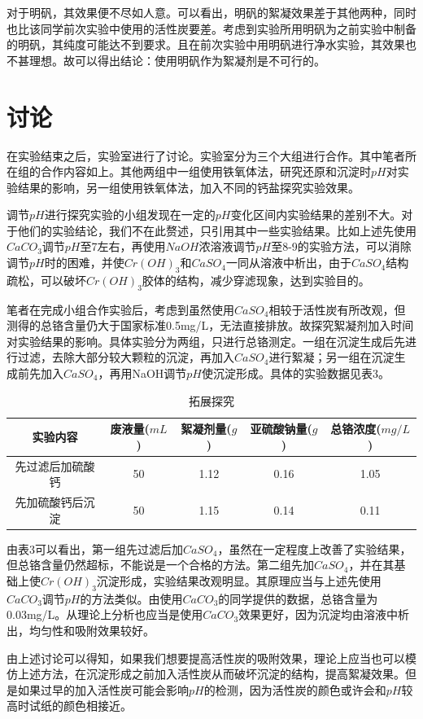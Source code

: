\documentclass[UTF8,a4paper,11pt,twocolumn]{ctexart}
\begin{document}
对于明矾，其效果便不尽如人意。可以看出，明矾的絮凝效果差于其他两种，同时也比该同学前次实验中使用的活性炭要差。考虑到实验所用明矾为之前实验中制备的明矾，其纯度可能达不到要求。且在前次实验中用明矾进行净水实验，其效果也不甚理想。故可以得出结论：使用明矾作为絮凝剂是不可行的。

\section{讨论}
在实验结束之后，实验室进行了讨论。实验室分为三个大组进行合作。其中笔者所在组的合作内容如上。其他两组中一组使用铁氧体法，研究还原和沉淀时$pH$对实验结果的影响，另一组使用铁氧体法，加入不同的钙盐探究实验效果。

调节$pH$进行探究实验的小组发现在一定的$pH$变化区间内实验结果的差别不大。对于他们的实验结论，我们不在此赘述，只引用其中一些实验结果。比如上述先使用$CaCO_3$调节$pH$至7左右，再使用$NaOH$浓溶液调节$pH$至8-9的实验方法，可以消除调节$pH$时的困难，并使$Cr(OH)_3$和$CaSO_4$一同从溶液中析出，由于$CaSO_4$结构疏松，可以破坏$Cr(OH)_3$胶体的结构，减少穿滤现象，达到实验目的。

笔者在完成小组合作实验后，考虑到虽然使用$CaSO_4$相较于活性炭有所改观，但测得的总铬含量仍大于国家标准0.5mg/L，无法直接排放。故探究絮凝剂加入时间对实验结果的影响。具体实验分为两组，只进行总铬测定。一组在沉淀生成后先进行过滤，去除大部分较大颗粒的沉淀，再加入$CaSO_4$进行絮凝；另一组在沉淀生成前先加入$CaSO_4$，再用NaOH调节$pH$使沉淀形成。具体的实验数据见表3。

\begin{table}[h]
\centering
\addtolength{\tabcolsep}{-1mm}
\begin{tabular}{ccccc}
\toprule
实验内容&废液量($mL$)&絮凝剂量($g$)&亚硫酸钠量($g$)&总铬浓度($mg/L$)\\
\midrule
先过滤后加硫酸钙&50&1.12&0.16&1.05\\
先加硫酸钙后沉淀&50&1.15&0.14&0.11\\
\bottomrule
\end{tabular}
\caption{拓展探究}
\end{table}

由表3可以看出，第一组先过滤后加$CaSO_4$，虽然在一定程度上改善了实验结果，但总铬含量仍然超标，不能说是一个合格的方法。第二组先加$CaSO_4$，并在其基础上使$Cr(OH)_3$沉淀形成，实验结果改观明显。其原理应当与上述先使用$CaCO_3$调节$pH$的方法类似。由使用$CaCO_3$的同学提供的数据，总铬含量为0.03mg/L。从理论上分析也应当是使用$CaCO_3$效果更好，因为沉淀均由溶液中析出，均匀性和吸附效果较好。

由上述讨论可以得知，如果我们想要提高活性炭的吸附效果，理论上应当也可以模仿上述方法，在沉淀形成之前加入活性炭从而破坏沉淀的结构，提高絮凝效果。但是如果过早的加入活性炭可能会影响$pH$的检测，因为活性炭的颜色或许会和$pH$较高时试纸的颜色相接近。
\end{document}
